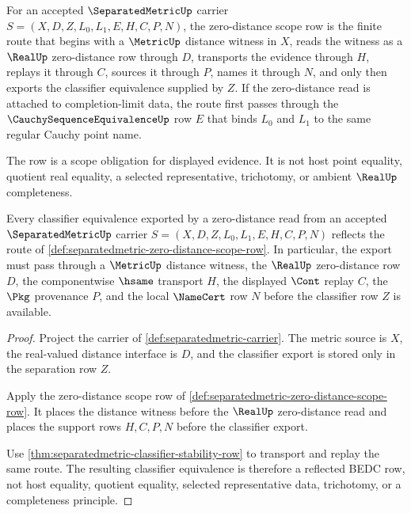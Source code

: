 \begin{definition}
\label{def:separatedmetric-zero-distance-scope-row}
For an accepted $\SeparatedMetricUp$ carrier $S=(X,D,Z,L_0,L_1,E,H,C,P,N)$, the zero-distance scope row is the finite route that begins with a $\MetricUp$ distance witness in $X$, reads the witness as a $\RealUp$ zero-distance row through $D$, transports the evidence through $H$, replays it through $C$, sources it through $P$, names it through $N$, and only then exports the classifier equivalence supplied by $Z$. If the zero-distance read is attached to completion-limit data, the route first passes through the $\CauchySequenceEquivalenceUp$ row $E$ that binds $L_0$ and $L_1$ to the same regular Cauchy point name.

The row is a scope obligation for displayed evidence. It is not host point equality, quotient real equality, a selected representative, trichotomy, or ambient $\RealUp$ completeness.
\end{definition}

\begin{theorem}
\label{thm:separatedmetric-zero-distance-reflection}
Every classifier equivalence exported by a zero-distance read from an accepted $\SeparatedMetricUp$ carrier $S=(X,D,Z,L_0,L_1,E,H,C,P,N)$ reflects the route of \autoref{def:separatedmetric-zero-distance-scope-row}. In particular, the export must pass through a $\MetricUp$ distance witness, the $\RealUp$ zero-distance row $D$, the componentwise $\hsame$ transport $H$, the displayed $\Cont$ replay $C$, the $\Pkg$ provenance $P$, and the local $\NameCert$ row $N$ before the classifier row $Z$ is available.
\end{theorem}
\begin{proof}
Project the carrier of \autoref{def:separatedmetric-carrier}. The metric source is $X$, the real-valued distance interface is $D$, and the classifier export is stored only in the separation row $Z$.

Apply the zero-distance scope row of \autoref{def:separatedmetric-zero-distance-scope-row}. It places the distance witness before the $\RealUp$ zero-distance read and places the support rows $H,C,P,N$ before the classifier export.

Use \autoref{thm:separatedmetric-classifier-stability-row} to transport and replay the same route. The resulting classifier equivalence is therefore a reflected BEDC row, not host equality, quotient equality, selected representative data, trichotomy, or a completeness principle.
\end{proof}

